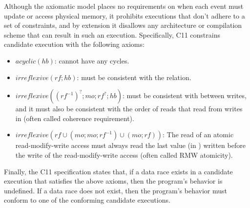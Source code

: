 Although the axiomatic model places no requirements on when each event must update or
    access physical memory, it prohibits executions that don't adhere to a set of
    constraints, and by extension it disallows any architecture or compilation scheme
    that can result in such an execution. Specifically, C11 constrains candidate
    execution with the following axioms:

\begin{itemize}
    \item $acyclic(hb)$: \relHB{} cannot have any cycles.
    \item $irreflexive(rf;hb)$: \relHB{} must be consistent with the \relRF{} relation.
    \item $irreflexive((rf^{-1})^{?};mo;rf^?;hb)$: \relHB{} must be consistent with
        \relMO{} between writes, and it must also be consistent with the order of reads
        that read from writes in \relMO{} (often called coherence requirement).
    \item $irreflexive(rf \cup (mo;mo;rf^{-1}) \cup (mo;rf))$: The read of an atomic
        read-modify-write access must always read the last value (in \relMO{}) written
        before the write of the read-modify-write access (often called RMW atomicity).
\end{itemize}

Finally, the C11 specification states that, if a data race exists in a candidate
    execution that satisfies the above axioms, then the program's behavior is undefined.
    If a data race does not exist, then the program's behavior must conform to one of
    the conforming candidate executions.

\begin{description}
\end{description}


